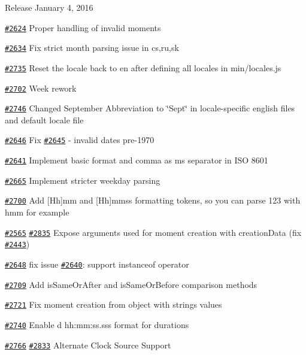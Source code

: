 \begin{DoxyItemize}
\item Release January 4, 2016
\item \href{https://github.com/moment/moment/pull/2624}{\tt \#2624} Proper handling of invalid moments
\item \href{https://github.com/moment/moment/pull/2634}{\tt \#2634} Fix strict month parsing issue in cs,ru,sk
\item \href{https://github.com/moment/moment/pull/2735}{\tt \#2735} Reset the locale back to \textquotesingle{}en\textquotesingle{} after defining all locales in min/locales.\+js
\item \href{https://github.com/moment/moment/pull/2702}{\tt \#2702} Week rework
\item \href{https://github.com/moment/moment/pull/2746}{\tt \#2746} Changed September Abbreviation to \char`\"{}\+Sept\char`\"{} in locale-\/specific english files and default locale file
\item \href{https://github.com/moment/moment/pull/2646}{\tt \#2646} Fix \href{https://github.com/moment/moment/pull/2645}{\tt \#2645} -\/ invalid dates pre-\/1970
\item \href{https://github.com/moment/moment/pull/2641}{\tt \#2641} Implement basic format and comma as ms separator in I\+SO 8601
\item \href{https://github.com/moment/moment/pull/2665}{\tt \#2665} Implement stricter weekday parsing
\item \href{https://github.com/moment/moment/pull/2700}{\tt \#2700} Add \mbox{[}Hh\mbox{]}mm and \mbox{[}Hh\mbox{]}mmss formatting tokens, so you can parse 123 with hmm for example
\item \href{https://github.com/moment/moment/pull/2565}{\tt \#2565} \href{https://github.com/moment/moment/pull/2835}{\tt \#2835} Expose arguments used for moment creation with creation\+Data (fix \href{https://github.com/moment/moment/pull/2443}{\tt \#2443})
\item \href{https://github.com/moment/moment/pull/2648}{\tt \#2648} fix issue \href{https://github.com/moment/moment/pull/2640}{\tt \#2640}\+: support instanceof operator
\item \href{https://github.com/moment/moment/pull/2709}{\tt \#2709} Add is\+Same\+Or\+After and is\+Same\+Or\+Before comparison methods
\item \href{https://github.com/moment/moment/pull/2721}{\tt \#2721} Fix moment creation from object with strings values
\item \href{https://github.com/moment/moment/pull/2740}{\tt \#2740} Enable \textquotesingle{}d hh\+:mm\+:ss.\+sss\textquotesingle{} format for durations
\item \href{https://github.com/moment/moment/pull/2766}{\tt \#2766} \href{https://github.com/moment/moment/pull/2833}{\tt \#2833} Alternate Clock Source Support
\end{DoxyItemize}


